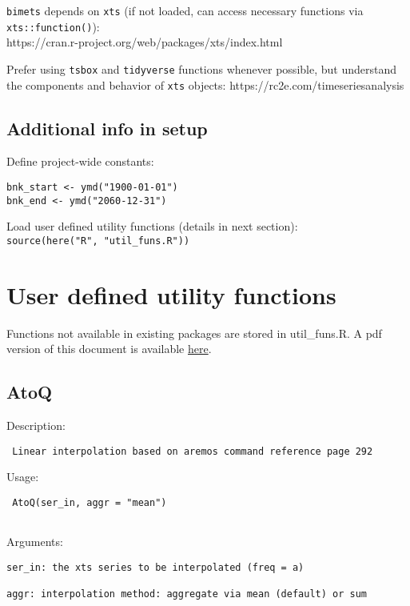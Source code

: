 \documentclass[
  letterpaper,
  DIV=11,
  numbers=noendperiod]{scrreport}
\begin{document}
\texttt{bimets} depends on \texttt{xts} (if not loaded, can access
necessary functions via \texttt{xts::function()}):\\
https://cran.r-project.org/web/packages/xts/index.html

Prefer using \texttt{tsbox} and \texttt{tidyverse} functions whenever
possible, but understand the components and behavior of \texttt{xts}
objects: https://rc2e.com/timeseriesanalysis

\section{Additional info in setup}\label{additional-info-in-setup}

Define project-wide constants:

\begin{verbatim}
bnk_start <- ymd("1900-01-01")
bnk_end <- ymd("2060-12-31")
\end{verbatim}

Load user defined utility functions (details in next section):\\
\texttt{source(here("R",\ "util\_funs.R"))}


\chapter{User defined utility
functions}\label{user-defined-utility-functions}

Functions not available in existing packages are stored in util\_funs.R.
A pdf version of this document is available \href{util_funs.pdf}{here}.

\section{AtoQ}\label{atoq}

Description:

\begin{verbatim}
 Linear interpolation based on aremos command reference page 292
\end{verbatim}

Usage:

\begin{verbatim}
 AtoQ(ser_in, aggr = "mean")
 
\end{verbatim}

Arguments:

\begin{verbatim}
ser_in: the xts series to be interpolated (freq = a)

aggr: interpolation method: aggregate via mean (default) or sum
\end{verbatim}
\end{document}
